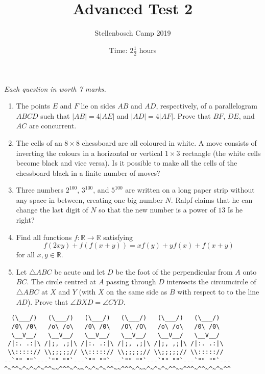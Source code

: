 \documentclass{article}
\title{Advanced Test 2}
\author{Stellenbosch Camp 2019}
\date{Time: $2\frac{1}{2}$ hours}
\begin{document}
\maketitle
\thispagestyle{empty}

\hfill\textit{Each question in worth 7 marks.}

\vfill


\begin{enumerate}[1.]

\item %
The points $E$ and $F$ lie on sides $AB$ and $AD$, respectively, of a parallelogram $ABCD$ such that $|AB| = 4|AE|$ and $|AD| = 4|AF|$.
Prove that $BF$, $DE$, and $AC$ are concurrent.


\item %
The cells of an $8 \times 8$ chessboard are all coloured in white.
A move consists of inverting the colours in a horizontal or vertical $1 \times 3$ rectangle (the white cells become black and vice versa).
Is it possible to make all the cells of the chessboard black in a finite number of moves?


\item %
Three numbers $2^{100}$, $3^{100}$, and $5^{100}$ are written on a long paper strip without any space in between, creating one big number $N$.
Ralpf claims that he can change the last digit of $N$ so that the new number is a power of $13$
Is he right?


\item
Find all functions $f: \mathbb{R} \to \mathbb{R}$ satisfying
\[ f(2xy) +f(f(x+y)) = xf(y) + yf(x) +f(x+y) \]
for all $x,y \in \mathbb{R}$.


\item %
Let $\triangle ABC$ be acute and let $D$ be the foot of the perpendicular from $A$ onto $BC$.
The circle centred at $A$ passing through $D$ intersects the circumcircle of $\triangle ABC$ at $X$ and $Y$ (with $X$ on the same side as $B$ with respect to to the line $AD$).
Prove that $\angle BXD = \angle CYD$.

\end{enumerate}


\vfill
\begin{center}
\begin{BVerbatim}
  (\___/)   (\___/)   (\___/)   (\___/)   (\___/)   (\___/)
  /0\ /0\   /o\ /o\   /0\ /0\   /O\ /O\   /o\ /o\   /0\ /0\
  \__V__/   \__V__/   \__V__/   \__V__/   \__V__/   \__V__/
 /|:. .:|\ /|;, ,;|\ /|:. .:|\ /|;, ,;|\ /|;, ,;|\ /|:. .:|\
 \\:::::// \\;;;;;// \\:::::// \\;;;;;// \\;;;;;// \\::::://
--`"" ""`---`"" ""`---`"" ""`---`"" ""`---`"" ""`---`"" ""`---
^~^^~^~^~^~^^~~^^^~^~~^~^~^~^^~~^^^~^~~^~^~^~^^~~^^^~^^~^~^~^^
\end{BVerbatim}
\end{center}
\end{document}
